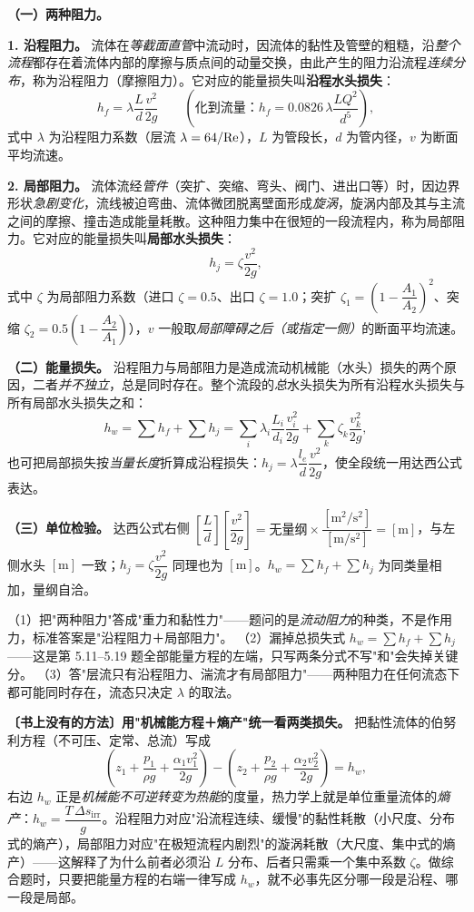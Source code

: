 \begin{jie}
\textbf{（一）两种阻力。}

\textbf{1. 沿程阻力。} 流体在\emph{等截面直管}中流动时，因流体的黏性及管壁的粗糙，沿\emph{整个流程}都存在着流体内部的摩擦与质点间的动量交换，由此产生的阻力沿流程\emph{连续分布}，称为沿程阻力（摩擦阻力）。它对应的能量损失叫\textbf{沿程水头损失}：
\[h_f=\lambda\frac{L}{d}\frac{v^2}{2g}\qquad\left(\text{化到流量：}h_f=0.0826\,\lambda\frac{LQ^2}{d^5}\right),\]
式中 $\lambda$ 为沿程阻力系数（层流 $\lambda=64/\mathrm{Re}$），$L$ 为管段长，$d$ 为管内径，$v$ 为断面平均流速。

\textbf{2. 局部阻力。} 流体流经\emph{管件}（突扩、突缩、弯头、阀门、进出口等）时，因边界形状\emph{急剧变化}，流线被迫弯曲、流体微团脱离壁面形成\emph{旋涡}，旋涡内部及其与主流之间的摩擦、撞击造成能量耗散。这种阻力集中在很短的一段流程内，称为局部阻力。它对应的能量损失叫\textbf{局部水头损失}：
\[h_j=\zeta\frac{v^2}{2g},\]
式中 $\zeta$ 为局部阻力系数（进口 $\zeta=0.5$、出口 $\zeta=1.0$；突扩 $\zeta_1=\left(1-\dfrac{A_1}{A_2}\right)^2$、突缩 $\zeta_2=0.5\left(1-\dfrac{A_2}{A_1}\right)$），$v$ 一般取\emph{局部障碍之后（或指定一侧）}的断面平均流速。

\textbf{（二）能量损失。} 沿程阻力与局部阻力是造成流动机械能（水头）损失的两个原因，二者\emph{并不独立}，总是同时存在。整个流段的\emph{总}水头损失为所有沿程水头损失与所有局部水头损失之和：
\[h_w=\sum h_f+\sum h_j
=\sum_i\lambda_i\frac{L_i}{d_i}\frac{v_i^2}{2g}+\sum_k\zeta_k\frac{v_k^2}{2g},\]
也可把局部损失按\emph{当量长度}折算成沿程损失：$h_j=\lambda\dfrac{l_e}{d}\dfrac{v^2}{2g}$，使全段统一用达西公式表达。

\textbf{（三）单位检验。} 达西公式右侧 $\left[\dfrac{L}{d}\right]\left[\dfrac{v^2}{2g}\right]=\text{无量纲}\times\dfrac{[\mathrm{m^2/s^2}]}{[\mathrm{m/s^2}]}=[\mathrm{m}]$，与左侧水头 $[\mathrm{m}]$ 一致；$h_j=\zeta\dfrac{v^2}{2g}$ 同理也为 $[\mathrm{m}]$。$h_w=\sum h_f+\sum h_j$ 为同类量相加，量纲自洽。
\end{jie}
\begin{yicuo}
（1）把"两种阻力"答成"重力和黏性力"——题问的是\emph{流动阻力}的种类，不是作用力，标准答案是"沿程阻力＋局部阻力"。
（2）漏掉总损失式 $h_w=\sum h_f+\sum h_j$——这是第 5.11--5.19 题全部能量方程的左端，只写两条分式不写"和"会失掉关键分。
（3）答"层流只有沿程阻力、湍流才有局部阻力"——两种阻力在任何流态下都可能同时存在，流态只决定 $\lambda$ 的取法。
\end{yicuo}
\begin{banfa}
\textbf{〔书上没有的方法〕用"机械能方程＋熵产"统一看两类损失。} 把黏性流体的伯努利方程（不可压、定常、总流）写成
\[\left(z_1+\frac{p_1}{\rho g}+\frac{\alpha_1v_1^2}{2g}\right)-\left(z_2+\frac{p_2}{\rho g}+\frac{\alpha_2v_2^2}{2g}\right)=h_w,\]
右边 $h_w$ 正是\emph{机械能不可逆转变为热能}的度量，热力学上就是单位重量流体的\emph{熵产}：$h_w=\dfrac{T\,\Delta s_{\text{irr}}}{g}$。沿程阻力对应"沿流程连续、缓慢"的黏性耗散（小尺度、分布式的熵产），局部阻力对应"在极短流程内剧烈"的漩涡耗散（大尺度、集中式的熵产）——这解释了为什么前者必须沿 $L$ 分布、后者只需乘一个集中系数 $\zeta$。做综合题时，只要把能量方程的右端一律写成 $h_w$，就不必事先区分哪一段是沿程、哪一段是局部。
\end{banfa}


